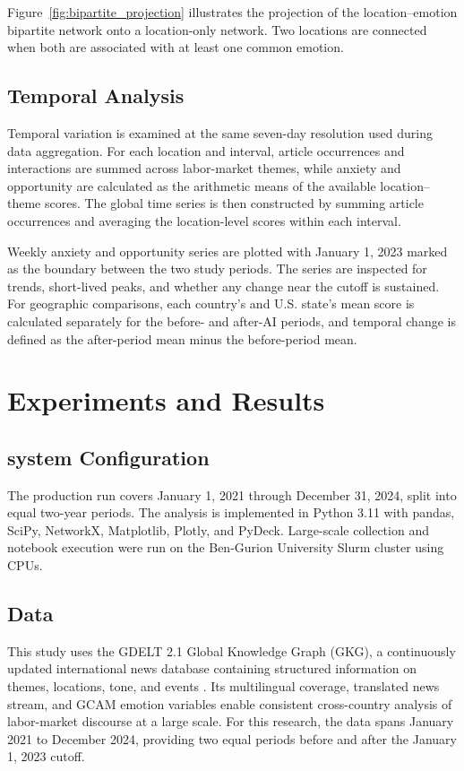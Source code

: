 \documentclass[conference]{IEEEtran}
\begin{document}
Figure~\ref{fig:bipartite_projection} illustrates the projection of the
location--emotion bipartite network onto a location-only network.
Two locations are connected when both are associated with at least one
common emotion.

\subsection{Temporal Analysis}

Temporal variation is examined at the same seven-day resolution used during
data aggregation. For each location and interval, article occurrences and
interactions are summed across labor-market themes, while anxiety and
opportunity are calculated as the arithmetic means of the available
location--theme scores. The global time series is then constructed by summing
article occurrences and averaging the location-level scores within each
interval.

Weekly anxiety and opportunity series are plotted with January 1, 2023 marked
as the boundary between the two study periods. The series are inspected for
trends, short-lived peaks, and whether any change near the cutoff is sustained.
For geographic comparisons, each country's and U.S. state's mean score is
calculated separately for the before- and after-AI periods, and temporal change
is defined as the after-period mean minus the before-period mean.


\section{Experiments and Results}

\subsection{system Configuration}

The production run covers January 1, 2021 through December 31, 2024, split
into equal two-year periods. 
The analysis is implemented in Python 3.11 with
pandas, SciPy, NetworkX, Matplotlib, Plotly, and PyDeck. 
Large-scale collection and notebook execution were run on the Ben-Gurion
University Slurm cluster using CPUs.

\subsection{Data}

This study uses the GDELT 2.1 Global Knowledge Graph (GKG), 
a continuously updated international news database 
containing structured information on themes, locations, tone, and events 
\cite{leetaru2013gdelt,gdeltgkg2015Codebook}. 
Its multilingual coverage, translated news stream, and GCAM emotion variables 
enable consistent cross-country analysis of labor-market discourse at a 
large scale.
For this research, the data spans January 2021 to December 2024, 
providing two equal periods before and after the January 1, 2023 cutoff.
\end{document}
